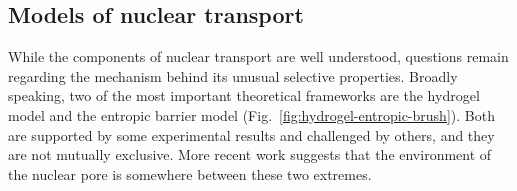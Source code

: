 
%
%
%
%

\subsection{Models of nuclear transport}

While the components of nuclear transport are well understood, questions remain regarding the mechanism behind its unusual selective properties.  Broadly speaking, two of the most important theoretical frameworks are the hydrogel model and the entropic barrier model (Fig.~\ref{fig:hydrogel-entropic-brush}).  Both are supported by some experimental results and challenged by others, and they are not mutually exclusive.  More recent work suggests that the environment of the nuclear pore is somewhere between these two extremes.

